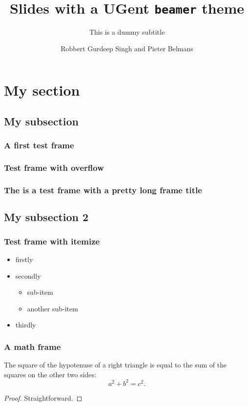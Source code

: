 \documentclass{beamer}
\title{Slides with a UGent \texttt{beamer} theme}
\subtitle{This is a dummy subtitle}
\institute{Department of Nonsense}
\author{Robbert Gurdeep Singh and Pieter Belmans}
\begin{document}
\begin{frame}
  \titlepage
\end{frame}

\section{My section}
\subsection{My subsection}

\begin{frame}
  \frametitle{A first test frame}

  \lipsum[2]
\end{frame}

\begin{frame}
  \frametitle{Test frame with overflow}

  \lipsum[2-3]
\end{frame}

\begin{frame}
  \frametitle{The is a test frame with a pretty long frame title}

  \lipsum[2]
\end{frame}


\subsection{My subsection 2}
\begin{frame}
  \frametitle{Test frame with itemize}

  \begin{itemize}
    \item<1-> firstly
    \item<2-> secondly
      \begin{itemize}
        \item sub-item
        \item another sub-item
      \end{itemize}
    \item<3-> thirdly
  \end{itemize}
\end{frame}

\begin{frame}
  \frametitle{A math frame}

  \begin{theorem}[Pythagoras]
    The square of the hypotenuse of a \alert{right} triangle is equal to the sum of the squares on the other two sides:
    \[
      a^2 + b^2 = c^2.
    \]
  \end{theorem}
  \begin{proof}
    Straightforward.
  \end{proof}
\end{frame}
\end{document}
